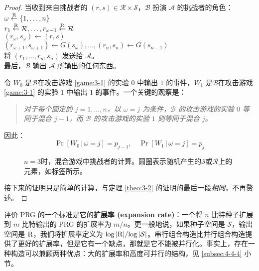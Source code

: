 \begin{proof}
\hspace*{5pt} 当收到来自挑战者的 $(r,s)\in\mathcal{R}\times\mathcal{S}$，$\mathcal B$ 扮演 $\mathcal A$ 的挑战者的角色：\\
\hspace*{50pt} $\omega\overset{\rm R}\leftarrow\{1,\dots,n\}$\\
\hspace*{50pt} $r_1\overset{\rm R}\leftarrow\mathcal R,\dots,r_{\omega-1}\overset{\rm R}\leftarrow\mathcal R$\\
\hspace*{50pt} $(r_{\omega},s_{\omega})\leftarrow(r,s)$\\
\hspace*{50pt} $(r_{\omega+1},s_{\omega+1})\leftarrow G(s_{\omega}),\dots,(r_n,s_n)\leftarrow G(s_{n-1})$\\
\hspace*{50pt} 将 $(r_1,\dots,r_n,s_n)$ 发送给 $\mathcal A$。\\
\hspace*{26pt} 最后，$\mathcal B$ 输出 $\mathcal A$ 所输出的任何东西。

\vspace*{5pt}

令 $W_0$ 是$\mathcal B$在攻击游戏 \ref{game:3-1} 的实验 $0$ 中输出 $1$ 的事件，$W_1$ 是$\mathcal B$在攻击游戏 \ref{game:3-1} 的实验 $1$ 中输出 $1$ 的事件。一个关键的观察是：
\begin{quote}
\emph{对于每个固定的 $j=1,\dots,n$，以 $\omega=j$ 为条件，$\mathcal B$ 的攻击游戏的实验 $0$ 等同于混合 $j-1$，而 $\mathcal B$ 的攻击游戏的实验 $1$ 则等同于混合 $j$。
}
\end{quote}
因此：
\[
\Pr[W_0\,|\,\omega=j]=p_{j-1},
\quad
\Pr[W_1\,|\,\omega=j]=p_{j}
\]

\begin{figure}
	\centering
	
	\caption{$n=3$时，混合游戏中挑战者的计算。圆圈表示随机产生的$\mathcal{S}$或$\mathcal{R}$上的元素，如标签所示。}
	\label{fig:3-7}
\end{figure}

接下来的证明只是简单的计算，与定理 \ref{theo:3-2} 的证明的最后一段\emph{相同}，不再赘述。
\end{proof}

评价 PRG 的一个标准是它的\textbf{扩展率 (expansion rate)}：一个将 $n$ 比特种子扩展到 $m$ 比特输出的 PRG 的扩展率为 ${m}/{n}$。更一般地说，如果种子空间是 $\mathcal{S}$，输出空间是 $\mathcal{\rm R}$，我们将扩展率定义为 ${\log|\mathcal{\rm R}|}/{\log|\mathcal{S}|}$。串行组合构造比并行组合构造提供了更好的扩展率，但是它有一个缺点，那就是它不能被并行化。事实上，存在一种构造可以兼顾两种优点：大的扩展率和高度可并行的结构，见 \ref{subsec:4-4-4} 小节。

